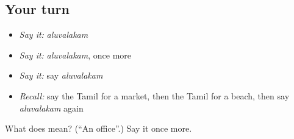 \subsection*{Your turn}
\begin{itemize}
\raggedright
  \item \emph{Say it:} \emph{aluvalakam}
  \item \emph{Say it:} \emph{aluvalakam}, once more
  \item \emph{Say it:} say \emph{aluvalakam}
  \item \emph{Recall:} say the Tamil for a market, then the Tamil for a beach, then say \emph{aluvalakam} again
\end{itemize}

\begin{tcolorbox}[breakable,colback=teal!4,colframe=teal!35!black,title={Before you move on}]
What does  mean? (\textquotedblleft{}An office\textquotedblright{}.) Say it once more.
\end{tcolorbox}
